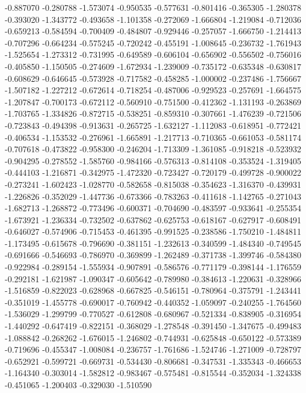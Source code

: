 -0.887070
-0.280788
-1.573074
-0.950535
-0.577631
-0.801416
-0.365305
-1.280378
-0.393020
-1.343772
-0.493658
-1.101358
-0.272069
-1.666804
-1.219084
-0.712036
-0.659213
-0.584594
-0.700409
-0.484807
-0.929446
-0.257057
-1.666750
-1.214413
-0.707296
-0.664234
-0.575245
-0.720242
-0.455191
-1.008645
-0.236732
-1.761943
-1.525654
-1.273312
-0.731995
-0.649589
-0.606104
-0.656902
-0.556502
-0.756016
-0.405850
-1.150505
-0.274609
-1.672934
-1.239009
-0.735172
-0.635348
-0.630817
-0.608629
-0.646645
-0.573928
-0.717582
-0.458285
-1.000002
-0.237486
-1.756667
-1.507182
-1.227212
-0.672614
-0.718254
-0.487006
-0.929523
-0.257691
-1.664575
-1.207847
-0.700173
-0.672112
-0.560910
-0.751500
-0.412362
-1.131193
-0.263869
-1.703765
-1.334826
-0.872715
-0.538251
-0.859310
-0.307661
-1.476239
-0.721506
-0.723843
-0.494398
-0.913631
-0.265725
-1.632127
-1.112083
-0.618951
-0.772421
-0.406534
-1.153532
-0.276961
-1.665891
-1.217713
-0.710365
-0.661053
-0.581174
-0.707618
-0.473822
-0.958300
-0.246204
-1.713309
-1.361085
-0.918218
-0.523932
-0.904295
-0.278552
-1.585760
-0.984166
-0.576313
-0.814108
-0.353524
-1.319405
-0.444103
-1.216871
-0.342975
-1.472320
-0.723427
-0.720179
-0.499728
-0.900022
-0.273241
-1.602423
-1.028770
-0.582658
-0.815038
-0.354623
-1.316370
-0.439931
-1.226826
-0.352029
-1.447736
-0.673366
-0.783263
-0.411618
-1.142765
-0.271043
-1.682713
-1.268872
-0.773496
-0.600371
-0.704690
-0.483597
-0.933641
-0.255354
-1.673921
-1.236334
-0.732502
-0.637862
-0.625753
-0.618167
-0.627917
-0.608491
-0.646027
-0.574906
-0.715453
-0.461395
-0.991525
-0.238586
-1.750210
-1.484811
-1.173495
-0.615678
-0.796690
-0.381151
-1.232613
-0.340599
-1.484340
-0.749545
-0.691666
-0.546693
-0.786970
-0.369899
-1.262489
-0.371738
-1.399746
-0.584380
-0.922984
-0.289154
-1.555934
-0.907891
-0.586576
-0.771179
-0.398144
-1.176559
-0.292181
-1.621987
-1.090347
-0.605642
-0.789980
-0.384613
-1.220631
-0.328966
-1.516859
-0.822023
-0.628968
-0.667825
-0.546151
-0.780964
-0.375791
-1.243441
-0.351019
-1.455778
-0.690017
-0.760942
-0.440352
-1.059097
-0.240255
-1.764560
-1.536029
-1.299799
-0.770527
-0.612808
-0.680967
-0.521334
-0.838905
-0.316954
-1.440292
-0.647419
-0.822151
-0.368029
-1.278548
-0.391450
-1.347675
-0.499483
-1.088842
-0.268262
-1.676015
-1.246802
-0.744931
-0.625848
-0.650122
-0.573389
-0.719696
-0.455347
-1.008084
-0.236757
-1.761686
-1.524746
-1.271009
-0.728797
-0.652921
-0.599721
-0.669731
-0.534430
-0.806681
-0.347531
-1.335343
-0.466653
-1.164340
-0.303014
-1.582812
-0.983467
-0.575481
-0.815544
-0.352034
-1.324338
-0.451065
-1.200403
-0.329030
-1.510590
